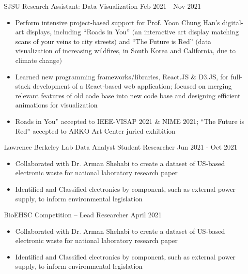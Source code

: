 \documentclass{article}
\begin{document}
\normalsize{
\noindent SJSU Research Assistant: Data Visualization \hfill Feb 2021 - Nov 2021
}
\small{
\begin{itemize}[noitemsep]
    \item Perform intensive project-based support for Prof. Yoon Chung Han’s digital-art displays, including “Roads in You” $($an interactive art display matching scans of your veins to city streets$)$ and “The Future is Red” $($data visualization of increasing wildfires,  in South Korea and California, due to climate change$)$
    \item Learned new programming frameworks/libraries, React.JS \& D3.JS, for full-stack development of a React-based web application; focused on merging relevant features of old code base into new code base and designing efficient animations for visualization
    \item Roads in You” accepted to IEEE-VISAP 2021 \& NIME 2021;  “The Future is Red” accepted to ARKO Art Center juried exhibition
\end{itemize}
\vspace*{0.2cm}
}


\normalsize{
\noindent Lawrence Berkeley Lab Data Analyst Student Researcher \hfill Jun 2021 - Oct 2021
}
\small{
\begin{itemize}[noitemsep]
    \item Collaborated with Dr. Arman Shehabi to create a dataset of US-based electronic waste for national laboratory research paper
    \item Identified and Classified electronics by component, such as external power supply, to inform environmental legislation
\end{itemize}
\vspace*{0.2cm}
}


\normalsize{
\noindent BioEHSC Competition – Lead Researcher \hfill April 2021
}
\small{
\begin{itemize}[noitemsep]
    \item Collaborated with Dr. Arman Shehabi to create a dataset of US-based electronic waste for national laboratory research paper
    \item Identified and Classified electronics by component, such as external power supply, to inform environmental legislation
\end{itemize}
}
\end{document}
